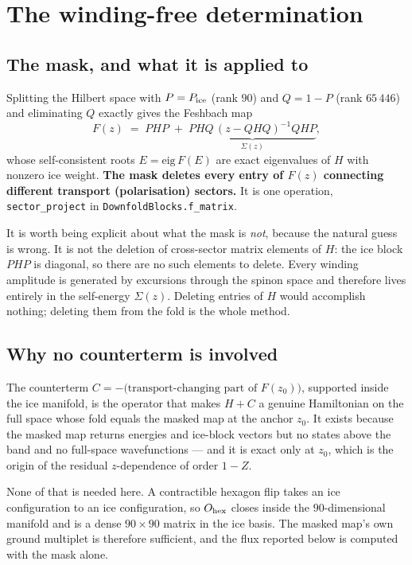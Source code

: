 \documentclass[11pt]{article}
\newcommand{\Ohex}{O_{\rm hex}}
\newcommand{\Pice}{P_{\rm ice}}
\begin{document}
\section{The winding-free determination}

\subsection{The mask, and what it is applied to}

Splitting the Hilbert space with $P=\Pice$ (rank $90$) and $Q=1-P$ (rank
$65\,446$) and eliminating $Q$ exactly gives the Feshbach map
\begin{equation}
F(z) \;=\; PHP \;+\; \underbrace{PHQ\,(z-QHQ)^{-1}QHP}_{\Sigma(z)},
\label{eq:feshbach}
\end{equation}
whose self-consistent roots $E=\mathrm{eig}\,F(E)$ are exact eigenvalues of
$H$ with nonzero ice weight.  \textbf{The mask deletes every entry of
$F(z)$ connecting different transport (polarisation) sectors.}  It is one
operation, \texttt{sector\_project} in
\texttt{DownfoldBlocks.f\_matrix}.

It is worth being explicit about what the mask is \emph{not}, because the
natural guess is wrong.  It is not the deletion of cross-sector matrix
elements of $H$: the ice block $PHP$ is diagonal, so there are no such
elements to delete.  Every winding amplitude is generated by excursions
through the spinon space and therefore lives entirely in the self-energy
$\Sigma(z)$.  Deleting entries of $H$ would accomplish nothing; deleting
them from the fold is the whole method.

\subsection{Why no counterterm is involved}

The counterterm $C=-\bigl(\text{transport-changing part of }F(z_0)\bigr)$,
supported inside the ice manifold, is the operator that makes $H+C$ a
genuine Hamiltonian on the full space whose fold equals the masked map at
the anchor $z_0$.  It exists because the masked map returns energies and
ice-block vectors but no states above the band and no full-space
wavefunctions --- and it is exact only at $z_0$, which is the origin of the
residual $z$-dependence of order $1-Z$.

None of that is needed here.  A contractible hexagon flip takes an ice
configuration to an ice configuration, so $\Ohex$ closes inside the
$90$-dimensional manifold and is a dense $90\times90$ matrix in the ice
basis.  The masked map's own ground multiplet is therefore sufficient, and
the flux reported below is computed with the mask alone.
\end{document}
